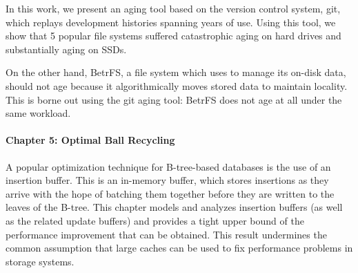 In this work, we present an aging tool based on the version control system,
git, which replays development histories spanning years of use.  Using this
tool, we show that 5 popular file systems suffered catastrophic aging on hard
drives and substantially aging on SSDs.

On the other hand, BetrFS, a file system which uses \bets to manage its on-disk
data, should not age because it algorithmically moves stored data to maintain
locality. This is borne out using the git aging tool: BetrFS does not age at
all under the same workload.

\paragraph{Chapter 5: Optimal Ball Recycling}

A popular optimization technique for B-tree-based databases is the use of an
insertion buffer. This is an in-memory buffer, which stores insertions as they
arrive with the hope of batching them together before they are written to the
leaves of the B-tree. This chapter models and analyzes insertion buffers (as
well as the related update buffers) and provides a tight upper bound of the
performance improvement that can be obtained. This result undermines the common
assumption that large caches can be used to fix performance problems in storage
systems.
